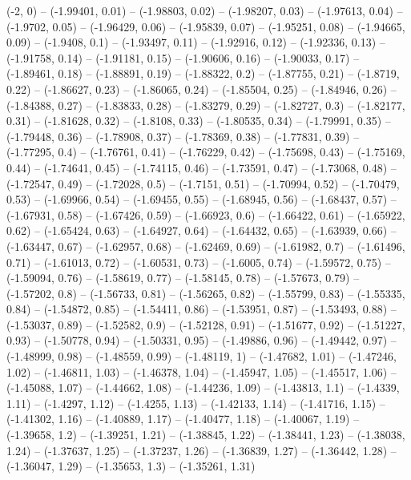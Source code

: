 \drawBand (-2, 0)
-- (-1.99401, 0.01)
-- (-1.98803, 0.02)
-- (-1.98207, 0.03)
-- (-1.97613, 0.04)
-- (-1.9702, 0.05)
-- (-1.96429, 0.06)
-- (-1.95839, 0.07)
-- (-1.95251, 0.08)
-- (-1.94665, 0.09)
-- (-1.9408, 0.1)
-- (-1.93497, 0.11)
-- (-1.92916, 0.12)
-- (-1.92336, 0.13)
-- (-1.91758, 0.14)
-- (-1.91181, 0.15)
-- (-1.90606, 0.16)
-- (-1.90033, 0.17)
-- (-1.89461, 0.18)
-- (-1.88891, 0.19)
-- (-1.88322, 0.2)
-- (-1.87755, 0.21)
-- (-1.8719, 0.22)
-- (-1.86627, 0.23)
-- (-1.86065, 0.24)
-- (-1.85504, 0.25)
-- (-1.84946, 0.26)
-- (-1.84388, 0.27)
-- (-1.83833, 0.28)
-- (-1.83279, 0.29)
-- (-1.82727, 0.3)
-- (-1.82177, 0.31)
-- (-1.81628, 0.32)
-- (-1.8108, 0.33)
-- (-1.80535, 0.34)
-- (-1.79991, 0.35)
-- (-1.79448, 0.36)
-- (-1.78908, 0.37)
-- (-1.78369, 0.38)
-- (-1.77831, 0.39)
-- (-1.77295, 0.4)
-- (-1.76761, 0.41)
-- (-1.76229, 0.42)
-- (-1.75698, 0.43)
-- (-1.75169, 0.44)
-- (-1.74641, 0.45)
-- (-1.74115, 0.46)
-- (-1.73591, 0.47)
-- (-1.73068, 0.48)
-- (-1.72547, 0.49)
-- (-1.72028, 0.5)
-- (-1.7151, 0.51)
-- (-1.70994, 0.52)
-- (-1.70479, 0.53)
-- (-1.69966, 0.54)
-- (-1.69455, 0.55)
-- (-1.68945, 0.56)
-- (-1.68437, 0.57)
-- (-1.67931, 0.58)
-- (-1.67426, 0.59)
-- (-1.66923, 0.6)
-- (-1.66422, 0.61)
-- (-1.65922, 0.62)
-- (-1.65424, 0.63)
-- (-1.64927, 0.64)
-- (-1.64432, 0.65)
-- (-1.63939, 0.66)
-- (-1.63447, 0.67)
-- (-1.62957, 0.68)
-- (-1.62469, 0.69)
-- (-1.61982, 0.7)
-- (-1.61496, 0.71)
-- (-1.61013, 0.72)
-- (-1.60531, 0.73)
-- (-1.6005, 0.74)
-- (-1.59572, 0.75)
-- (-1.59094, 0.76)
-- (-1.58619, 0.77)
-- (-1.58145, 0.78)
-- (-1.57673, 0.79)
-- (-1.57202, 0.8)
-- (-1.56733, 0.81)
-- (-1.56265, 0.82)
-- (-1.55799, 0.83)
-- (-1.55335, 0.84)
-- (-1.54872, 0.85)
-- (-1.54411, 0.86)
-- (-1.53951, 0.87)
-- (-1.53493, 0.88)
-- (-1.53037, 0.89)
-- (-1.52582, 0.9)
-- (-1.52128, 0.91)
-- (-1.51677, 0.92)
-- (-1.51227, 0.93)
-- (-1.50778, 0.94)
-- (-1.50331, 0.95)
-- (-1.49886, 0.96)
-- (-1.49442, 0.97)
-- (-1.48999, 0.98)
-- (-1.48559, 0.99)
-- (-1.48119, 1)
-- (-1.47682, 1.01)
-- (-1.47246, 1.02)
-- (-1.46811, 1.03)
-- (-1.46378, 1.04)
-- (-1.45947, 1.05)
-- (-1.45517, 1.06)
-- (-1.45088, 1.07)
-- (-1.44662, 1.08)
-- (-1.44236, 1.09)
-- (-1.43813, 1.1)
-- (-1.4339, 1.11)
-- (-1.4297, 1.12)
-- (-1.4255, 1.13)
-- (-1.42133, 1.14)
-- (-1.41716, 1.15)
-- (-1.41302, 1.16)
-- (-1.40889, 1.17)
-- (-1.40477, 1.18)
-- (-1.40067, 1.19)
-- (-1.39658, 1.2)
-- (-1.39251, 1.21)
-- (-1.38845, 1.22)
-- (-1.38441, 1.23)
-- (-1.38038, 1.24)
-- (-1.37637, 1.25)
-- (-1.37237, 1.26)
-- (-1.36839, 1.27)
-- (-1.36442, 1.28)
-- (-1.36047, 1.29)
-- (-1.35653, 1.3)
-- (-1.35261, 1.31)
